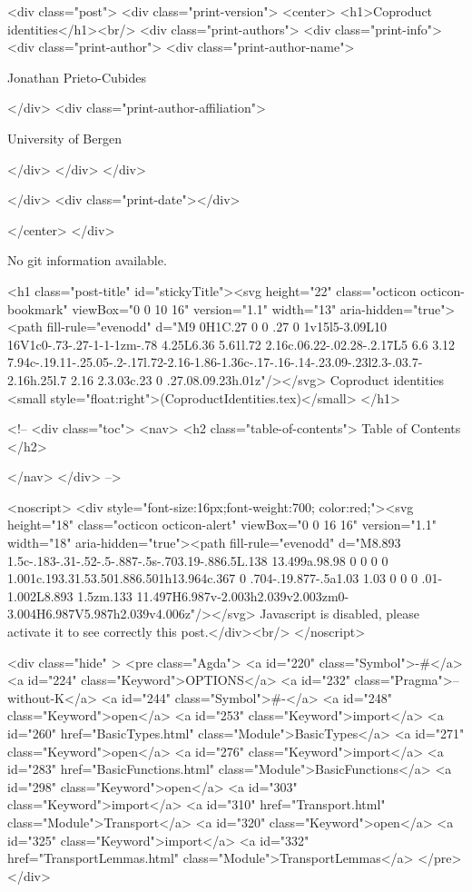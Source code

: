 <div class="post">
  <div class="print-version">
    <center>
      <h1>Coproduct identities</h1><br/>
        <div class="print-authors">
          <div class="print-info">
            <div class="print-author">
              <div class="print-author-name">
                
                  Jonathan Prieto-Cubides
                
              </div>
              <div class="print-author-affiliation">
                
                  University of Bergen
                
                </div>
            </div>
          </div>
          
          
        </div>
        <div class="print-date"></div>
        
        
    </center>
  </div>

  
  No git information available.
  

  <h1 class="post-title" id="stickyTitle"><svg height="22" class="octicon octicon-bookmark" viewBox="0 0 10 16" version="1.1" width="13" aria-hidden="true"><path fill-rule="evenodd" d="M9 0H1C.27 0 0 .27 0 1v15l5-3.09L10 16V1c0-.73-.27-1-1-1zm-.78 4.25L6.36 5.61l.72 2.16c.06.22-.02.28-.2.17L5 6.6 3.12 7.94c-.19.11-.25.05-.2-.17l.72-2.16-1.86-1.36c-.17-.16-.14-.23.09-.23l2.3-.03.7-2.16h.25l.7 2.16 2.3.03c.23 0 .27.08.09.23h.01z"/></svg> Coproduct identities <small style="float:right">(CoproductIdentities.tex)</small>
  </h1>

  <!-- 
  <div class="toc">
    <nav>
    <h2 class="table-of-contents"> Table of Contents </h2>
      

    </nav>
  </div>
   -->

  <noscript>
  <div style="font-size:16px;font-weight:700; color:red;"><svg height="18" class="octicon octicon-alert" viewBox="0 0 16 16" version="1.1" width="18" aria-hidden="true"><path fill-rule="evenodd" d="M8.893 1.5c-.183-.31-.52-.5-.887-.5s-.703.19-.886.5L.138 13.499a.98.98 0 0 0 0 1.001c.193.31.53.501.886.501h13.964c.367 0 .704-.19.877-.5a1.03 1.03 0 0 0 .01-1.002L8.893 1.5zm.133 11.497H6.987v-2.003h2.039v2.003zm0-3.004H6.987V5.987h2.039v4.006z"/></svg> Javascript is disabled, please activate it to see correctly this post.</div><br/>
  </noscript>

  <div class="hide" >
<pre class="Agda">
<a id="220" class="Symbol">{-#</a> <a id="224" class="Keyword">OPTIONS</a> <a id="232" class="Pragma">--without-K</a> <a id="244" class="Symbol">#-}</a>
<a id="248" class="Keyword">open</a> <a id="253" class="Keyword">import</a> <a id="260" href="BasicTypes.html" class="Module">BasicTypes</a>
<a id="271" class="Keyword">open</a> <a id="276" class="Keyword">import</a> <a id="283" href="BasicFunctions.html" class="Module">BasicFunctions</a>
<a id="298" class="Keyword">open</a> <a id="303" class="Keyword">import</a> <a id="310" href="Transport.html" class="Module">Transport</a>
<a id="320" class="Keyword">open</a> <a id="325" class="Keyword">import</a> <a id="332" href="TransportLemmas.html" class="Module">TransportLemmas</a>
</pre>
</div>


